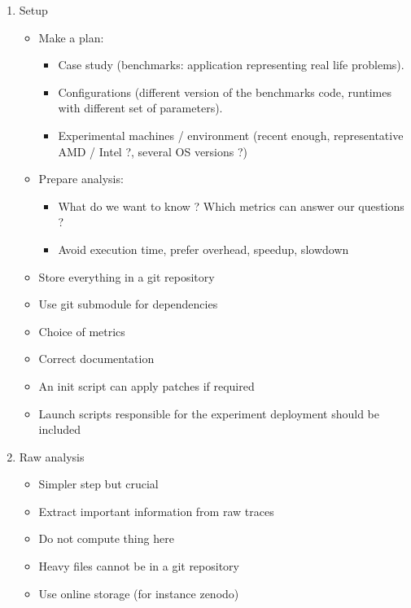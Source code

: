 \begin{enumerate}
    \item Setup
        \begin{itemize}
            \item Make a plan:
                \begin{itemize}
                    \item Case study (benchmarks: application representing real life
                        problems).
                    \item Configurations (different version of the benchmarks code,
                        runtimes with different set of parameters).
                    \item Experimental machines / environment (recent enough,
                        representative AMD / Intel ?, several OS versions ?)
                \end{itemize}
            \item Prepare analysis:
                \begin{itemize}
                    \item What do we want to know ? Which metrics can answer our
                        questions ?
                    \item Avoid execution time, prefer overhead, speedup, slowdown
                \end{itemize}
            \item Store everything in a git repository
            \item Use git submodule for dependencies
            \item Choice of metrics
            \item Correct documentation
            \item An init script can apply patches if required
            \item Launch scripts responsible for the experiment
                deployment should be included
        \end{itemize}
    \item Raw analysis
        \begin{itemize}
            \item Simpler step but crucial
            \item Extract important information from raw traces
            \item Do not compute thing here
            \item Heavy files cannot be in a git repository
            \item Use online storage (for instance zenodo)

\end{itemize}
\end{enumerate}
